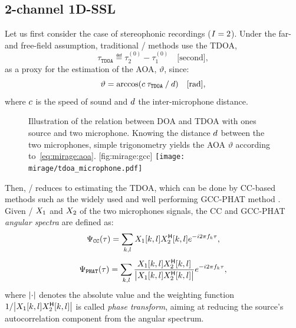 \subsection{2-channel 1D-SSL}\label{subsec:mirage:1D-SSL}
\newcommand{\tdoa}{\ensuremath{\tau_\mathtt{TDOA}}}
\newcommand{\aoa}{\ensuremath{\vartheta}}
Let us first consider the case of stereophonic recordings ($I=2$).
Under the far- and free-field assumption, traditional \SSL/ methods use the \acf{TDOA},
\begin{equation*}
    \tdoa \eqdef \tau^{(0)}_2 - \tau^{(0)}_1\quad\text{[second]}
    ,
\end{equation*}
as a proxy for the estimation of the \ac{AOA}, $\aoa$, since:
\begin{equation}\label{eq:mirage:aoa}
    \vartheta = \arccos \kparen{\speedOfSound \: \tdoa \: / \: \distMicMic }\quad\text{[rad]},
\end{equation}
where $c$ is the speed of sound and $d$ the inter-microphone distance.

\begin{figure}
    \begin{sidecaption}[]{
        Illustration of the relation between \ac{DOA} and \ac{TDOA} with ones source and two microphone.
        Knowing the distance $d$ between the two microphones, simple trigonometry yields the \ac{AOA} $\vartheta$ according to~\cref{eq:mirage:aoa}.
    }[fig:mirage:gcc]
        \texttt{[image: mirage/tdoa\_microphone.pdf]}
    \end{sidecaption}
\end{figure}


\mynewline
Then, \SSL/ reduces to estimating the \ac{TDOA}, which can be done by \ac{CC}-based methods such as the widely used and well performing \ac{GCC-PHAT} method .
Given \STFT/ $X_1$ and $X_2$ of the two microphones signals, the \ac{CC} and \ac{GCC-PHAT} \textit{angular spectra} are defined as:
\begin{equation}\label{eq:mirage:cc}
    \Psi_\mathtt{CC}(\tau) = \sum_{k,l} X_1[k,l] {\ensuremath{X}}^{\mathsf{H}}_2[k,l] {e}^{-{i} 2  \pi f_k \tau}
    ,
    \end{equation}
\begin{equation}\label{eq:mirage:gccphat}
    \Psi_\mathtt{PHAT}(\tau) = \sum_{k,l}\frac{\MIC_1[k,l] \khermitian{\MIC}_2[k,l]}{\kvbar{ \MIC_1[k,l] \khermitian{\MIC}_2[k,l] }} \cste^{-\csti 2  \pi f_k \tau}
    ,
\end{equation}
where $\kvbar{\cdot}$ denotes the absolute value and the weighting function $1 / \kvbar{ \MIC_1[k,l] \khermitian{\MIC}_2[k,l]}$ is called \textit{phase transform},
aiming at reducing the source's autocorrelation component from the angular spectrum.

